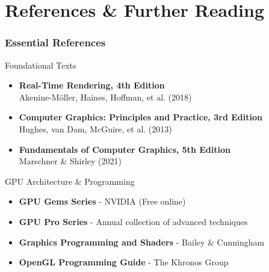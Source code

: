 \section{References \& Further Reading}

\begin{frame}
\frametitle{Essential References}

\begin{mathbox}{Foundational Texts}
\begin{itemize}
    \item \textbf{Real-Time Rendering, 4th Edition} \\
          Akenine-Möller, Haines, Hoffman, et al. (2018)
    \item \textbf{Computer Graphics: Principles and Practice, 3rd Edition} \\
          Hughes, van Dam, McGuire, et al. (2013)
    \item \textbf{Fundamentals of Computer Graphics, 5th Edition} \\
          Marschner \& Shirley (2021)
\end{itemize}
\end{mathbox}

\begin{conceptbox}{GPU Architecture \& Programming}
\begin{itemize}
    \item \textbf{GPU Gems Series} - NVIDIA (Free online)
    \item \textbf{GPU Pro Series} - Annual collection of advanced techniques
    \item \textbf{Graphics Programming and Shaders} - Bailey \& Cunningham
    \item \textbf{OpenGL Programming Guide} - The Khronos Group
\end{itemize}
\end{conceptbox}

\end{frame}

